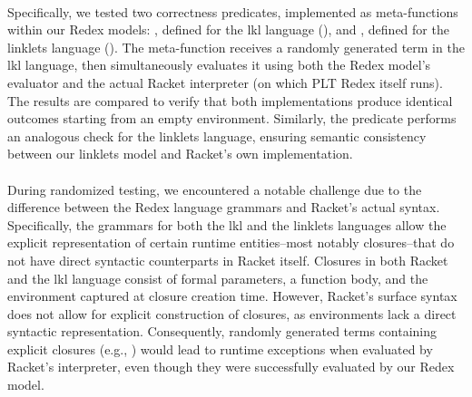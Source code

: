 			\paragraph{}%
				Specifically, we tested two correctness predicates, implemented as meta-functions within our Redex models: , defined for the \gls{lkl} language (), and , defined for the linklets language (). The meta-function  receives a randomly generated term in the \gls{lkl} language, then simultaneously evaluates it using both the Redex model's evaluator and the actual Racket interpreter (on which PLT Redex itself runs). The results are compared to verify that both implementations produce identical outcomes starting from an empty environment. Similarly, the  predicate performs an analogous check for the linklets language, ensuring semantic consistency between our linklets model and Racket’s own implementation.

			\paragraph{}%
				During randomized testing, we encountered a notable challenge due to the difference between the Redex language grammars and Racket's actual syntax. Specifically, the grammars for both the \gls{lkl} and the linklets languages allow the explicit representation of certain runtime entities--most notably closures--that do not have direct syntactic counterparts in Racket itself. Closures in both Racket and the \gls{lkl} language consist of formal parameters, a function body, and the environment captured at closure creation time. However, Racket’s surface syntax does not allow for explicit construction of closures, as environments lack a direct syntactic representation. Consequently, randomly generated terms containing explicit closures (e.g., ) would lead to runtime exceptions when evaluated by Racket’s interpreter, even though they were successfully evaluated by our Redex model.


